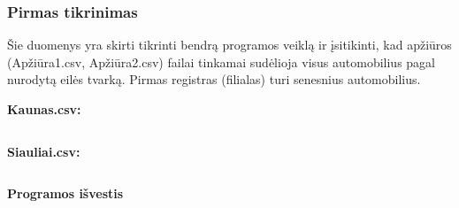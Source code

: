 \documentclass{article}
\begin{document}
\subsubsection{Pirmas tikrinimas}

Šie duomenys yra skirti tikrinti bendrą programos veiklą ir įsitikinti, kad apžiūros (Apžiūra1.csv, Apžiūra2.csv)
failai tinkamai sudėlioja visus automobilius pagal nurodytą eilės tvarką.
Pirmas registras (filialas) turi senesnius automobilius.

\begin{changemargin}{0cm}{0cm}
    \textbf{Kaunas.csv:}
\end{changemargin}

\inputminted{csharp}{Assets/L3/test1-input1.txt}

\begin{changemargin}{0cm}{0cm}
    \textbf{Siauliai.csv:}
\end{changemargin}

\inputminted{csharp}{Assets/L3/test1-input2.txt}

\textbf{Programos išvestis}
\end{document}
